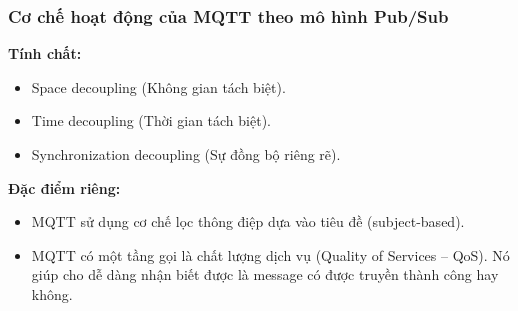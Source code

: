 \subsubsection{Cơ chế hoạt động của MQTT theo mô hình Pub/Sub}
\textbf{Tính chất:}
\begin{itemize}
	\item Space decoupling (Không gian tách biệt).
	\item Time decoupling (Thời gian tách biệt).
	\item Synchronization decoupling (Sự đồng bộ riêng rẽ).
\end{itemize}

\indent \textbf{Đặc điểm riêng:}
\begin{itemize}
	\item MQTT sử dụng cơ chế lọc thông điệp dựa vào tiêu đề (subject-based).
	\item MQTT có một tầng gọi là chất lượng dịch vụ (Quality of Services – QoS). Nó giúp cho dễ dàng nhận biết được là message có được truyền thành công hay không.
\end{itemize}

